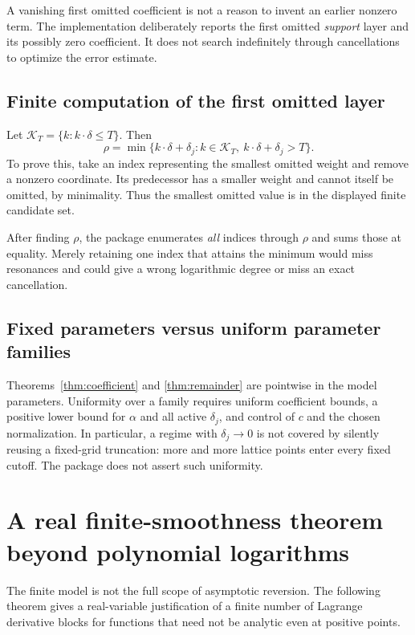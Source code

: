 \documentclass[11pt,a4paper]{article}
\numberwithin{equation}{section}
\theoremstyle{definition}\newtheorem{definition}[theorem]{Definition}
\theoremstyle{remark}\newtheorem{remark}[theorem]{Remark}
\begin{document}
A vanishing first omitted coefficient is not a reason to invent an earlier nonzero term. The implementation deliberately reports the first omitted \emph{support} layer and its possibly zero coefficient. It does not search indefinitely through cancellations to optimize the error estimate.

\subsection{Finite computation of the first omitted layer}
Let $\mathcal K_T=\{k:k\cdot\delta\le T\}$. Then
\begin{equation}\label{eq:frontier}
\rho=\min\{k\cdot\delta+\delta_j:
 k\in\mathcal K_T,\ k\cdot\delta+\delta_j>T\}.
\end{equation}
To prove this, take an index representing the smallest omitted weight and remove a nonzero coordinate. Its predecessor has a smaller weight and cannot itself be omitted, by minimality. Thus the smallest omitted value is in the displayed finite candidate set.

After finding $\rho$, the package enumerates \emph{all} indices through $\rho$ and sums those at equality. Merely retaining one index that attains the minimum would miss resonances and could give a wrong logarithmic degree or miss an exact cancellation.

\subsection{Fixed parameters versus uniform parameter families}
Theorems~\ref{thm:coefficient} and \ref{thm:remainder} are pointwise in the model parameters. Uniformity over a family requires uniform coefficient bounds, a positive lower bound for $\alpha$ and all active $\delta_j$, and control of $c$ and the chosen normalization. In particular, a regime with $\delta_j\to0$ is not covered by silently reusing a fixed-grid truncation: more and more lattice points enter every fixed cutoff. The package does not assert such uniformity.

\section{A real finite-smoothness theorem beyond polynomial logarithms}
\label{sec:smooth}
The finite model is not the full scope of asymptotic reversion. The following theorem gives a real-variable justification of a finite number of Lagrange derivative blocks for functions that need not be analytic even at positive points.
\end{document}
